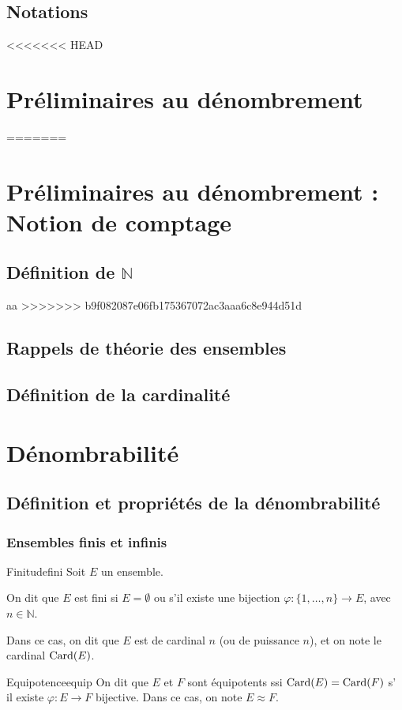 \documentclass[a4paper,french,final]{memoir}
\begin{document}
\chapter{Notations}
\mainmatter
<<<<<<< HEAD
\part{Préliminaires au dénombrement}
=======
\part{Préliminaires au dénombrement : Notion de comptage}
\chapter{\texorpdfstring{Définition de $\mathbb{N}$}{Définition de N}}
aa
>>>>>>> b9f082087e06fb175367072ac3aaa6c8e944d51d
\chapter{Rappels de théorie des ensembles}

\chapter{Définition de la cardinalité}
\part{Dénombrabilité}
\chapter{Définition et propriétés de la dénombrabilité}

\section{Ensembles finis et infinis}

\begin{defb}{Finitude}{fini}
     Soit $E$ un ensemble. 
	    
	On dit que $E$ est fini si $E = \emptyset$ ou s'il existe une bijection $\varphi : \{1,\dots,n \} \to E$, avec $n \in \mathbb{N}$. 
		
	Dans ce cas, on dit que $E$ est de cardinal $n$ (ou de puissance $n$), et on note le cardinal $\operatorname{Card}(E)$. 
\end{defb}

\begin{defb}{Equipotence}{equip}
    On dit que $E$ et $F$ sont équipotents ssi $\operatorname{Card}(E) = \operatorname{Card}(F)$ s' il existe $\varphi : E \to F$ bijective. Dans ce cas, on note $E \mathrel{\approx} F$. 
\end{defb}
\end{document}
